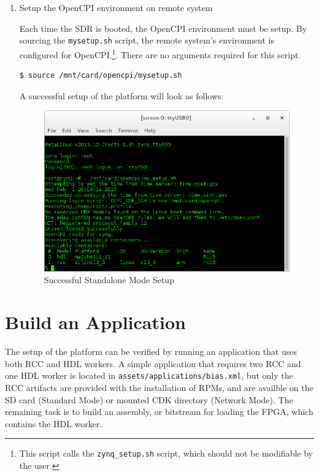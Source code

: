 \begin{enumerate}
\item Setup the OpenCPI environment on remote system

Each time the SDR is booted, the OpenCPI environment must be setup. By sourcing the \texttt{mysetup.sh} script, the remote system's environment is configured for OpenCPI.\footnote{This script calls the \texttt{zynq\_setup.sh} script, which should not be modifiable by the user.}. There are no arguments required for this script.
\begin{verbatim}
$ source /mnt/card/opencpi/mysetup.sh
\end{verbatim} \medskip

\noindent A successful setup of the platform will look as follows:
\begin{figure}[H]
	\centerline{\includegraphics[scale=0.5]{Matchstiq_Z1_setup}}
	\caption{Successful Standalone Mode Setup}
	\label{fig:standalonesetup}
\end{figure} \medskip



\end{enumerate}

\pagebreak
\section{Build an Application}
\begin{flushleft}
The setup of the platform can be verified by running an application that uses both RCC and HDL workers. A simple application that requires two RCC and one HDL worker is located in \texttt{assets/applications/bias.xml}, but only the RCC artifacts are provided with the installation of RPMs, and are availble on the SD card (Standard Mode) or mounted CDK directory (Network Mode). The remaining task is to build an assembly, or bitstream for loading the FPGA, which contains the HDL worker.
\end{flushleft}

